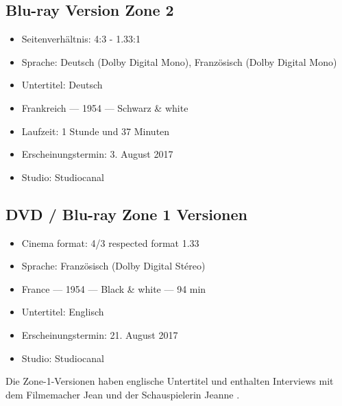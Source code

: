 \subsection*{Blu-ray Version Zone 2}

\begin{itemize}
	\item Seitenverhältnis: 4:3 - 1.33:1
	\item Sprache: Deutsch (Dolby Digital Mono), Französisch (Dolby Digital Mono)
	\item Untertitel: Deutsch
	\item Frankreich --- 1954 --- Schwarz \& white
	\item Laufzeit: 1 Stunde und 37 Minuten
	\item Erscheinungstermin: 3. August 2017
	\item Studio: Studiocanal
\end{itemize}

\subsection*{DVD / Blu-ray Zone 1 Versionen}

\begin{itemize}
	\item Cinema format: 4/3 respected format 1.33
	\item Sprache: Französisch (Dolby Digital Stéreo)
	\item France --- 1954 --- Black \& white --- 94 min
	\item Untertitel: Englisch
	\item Erscheinungstermin: 21. August 2017
	\item Studio: Studiocanal
\end{itemize}

Die Zone-1-Versionen haben englische Untertitel und enthalten Interviews mit dem Filmemacher Jean  und der Schauspielerin Jeanne .
